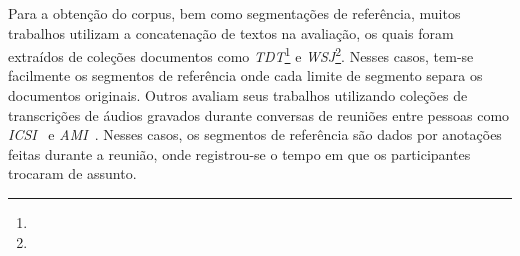 
Para a obtenção do corpus, bem como segmentações de referência, muitos trabalhos utilizam a concatenação de textos na avaliação, os quais foram extraídos de coleções documentos como 
\textit{TDT}\footnote{\urltdt} e
\textit{WSJ}\footnote{\urlwsj}.
Nesses casos, tem-se facilmente os segmentos de referência onde cada limite de segmento separa os documentos originais.
%
%
Outros avaliam seus trabalhos utilizando coleções de transcrições de áudios gravados durante conversas de reuniões entre pessoas como \textit{ICSI}~\cite{Janin2003} e \textit{AMI}~\cite{Carletta2005}.
Nesses casos, os segmentos de referência são dados por anotações feitas durante a reunião, onde registrou-se o tempo em que os participantes trocaram de assunto.

















%
%
%		
%
%
%
%

%





